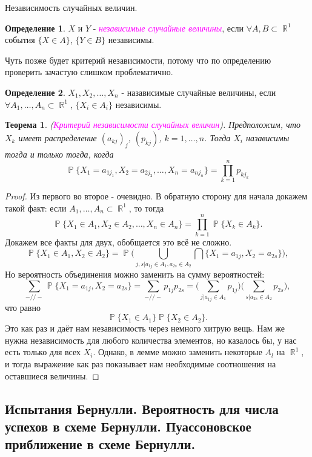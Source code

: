 \documentclass[a4paper,100pt]{article}
\theoremstyle{indented}
\newtheorem{theorem}{Теорема}
\theoremstyle{definition}
\newtheorem{defn}{Определение}
\theoremstyle{remark}
\DeclareMathOperator{\RR}{\mathbb{R}}
\DeclareMathOperator{\PP}{\mathbb{P}}
\begin{document}
Независимость случайных величин.

\begin{defn}
  $X$ и $Y$ - \hypertarget{n10}{\textcolor{magenta}{\textit{независимые случайные величины}}}, если $\forall A, B\subset \RR^1$ события $\{X\in A\}$, $\{Y\in B\}$ независимы.
\end{defn}

Чуть позже будет критерий независимости, потому что по определению проверить зачастую слишком проблематично. 

\begin{defn}
  $X_1, X_2, \ldots, X_n$ - назависимые случайные величины, если $\forall A_1, \ldots, A_n \subset \RR^1$, $\{X_i\in A_i\}$ независимы.
\end{defn}

\begin{theorem}
  (\hypertarget{n11}{\textcolor{magenta}{\textit{Критерий независимости случайных величин}}}). Предположим, что $X_k$ имеет распределение $(a_{kj})_j$, $(p_{kj})$, $k=1, \ldots, n$. Тогда $X_i$ назависимы тогда и только тогда, когда 
  \[
      \PP\{X_1=a_{1j_1}, X_2=a_{2j_2}, \ldots, X_n=a_{nj_n} \} = \prod_{k=1}^n p_{kj_k}
  \]
\end{theorem}

\begin{proof}
  Из первого во второе - очевидно. В обратную сторону для начала докажем такой факт: если $A_1, \ldots, A_n \subset \RR^1$, то тогда
  \[
      \PP\{X_1\in A_1, X_2\in A_2, \ldots, X_n \in A_n \} = \prod_{k=1}^n \PP \{X_k \in A_k\}. 
  \]
  Докажем все факты для двух, обобщается это всё не сложно. 
  \[
      \PP\{X_1\in A_1, X_2\in A_2\}=\PP\biggl( \bigcup_{j, s|a_{1j}\in A_1, a_{2s}\in A_2} \bigcap \{X_1=a_{1j}, X_2=a_{2s}\} \biggr), 
  \]
  Но вероятность объединения можно заменить на сумму вероятностей: 
  \[
      \sum_{-//-}\PP\{X_1=a_{1j}, X_2=a_{2s}\} = \sum_{-//-}p_{1j}p_{2s} = \biggl( \sum_{j|a_{1j}\in A_1} p_{1j}\biggr)\biggl( \sum_{s|a_{2s}\in A_2} p_{2s}\biggr), 
  \]
  что равно 
  \[
      \PP\{X_1\in A_1\} \PP\{X_2 \in A_2\}. 
  \]
  Это как раз и даёт нам независимость через немного хитрую вещь. Нам же нужна независимость для любого количества элементов, но казалось бы, у нас есть только для всех $X_i$. Однако, в лемме можно заменить некоторые $A_l$ на $\RR^1$, и тогда выражение как раз показывает нам необходимые соотношения на оставшиеся величины. 
\end{proof}

\subsection{Испытания Бернулли. Вероятность для числа успехов в схеме Бернулли. Пуассоновское приближение в схеме Бернулли.}
\end{document}
